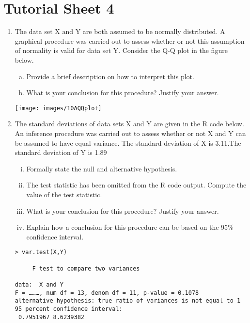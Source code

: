 \documentclass[a4paper,12pt]{article}
\begin{document}
\section*{Tutorial Sheet 4}
\begin{enumerate}

    
    \item


The data set X and Y are both assumed to be normally distributed. A graphical procedure was carried out to assess whether or not this assumption of normality is valid for data set Y. Consider the Q-Q plot in the figure below.
\begin{enumerate}[(a)]
\item Provide a brief description on how to interpret this plot.
\item What is your conclusion for this procedure? Justify your answer.
\end{enumerate}

	
	\begin{center}
		\texttt{[image: images/10AQQplot]}
	\end{center}
	

    \item

The standard deviations of data sets X and Y are given in the R code below. An inference procedure was carried out to assess whether or not X and Y can be assumed to have equal variance.
The standard deviation of X is 3.11.The standard deviation of Y is 1.89

\begin{enumerate}[(i)]
\item Formally state the null and alternative hypothesis.
\item The test statistic has been omitted from the R code output. Compute the value of the test statistic.
\item What is your conclusion for this procedure? Justify your answer.
\item Explain how a conclusion for this procedure can be based on the 95\% confidence interval.
\end{enumerate}
\begin{framed}
\begin{verbatim}
> var.test(X,Y)

     F test to compare two variances

data:  X and Y 
F = ………, num df = 13, denom df = 11, p-value = 0.1078
alternative hypothesis: true ratio of variances is not equal to 1 
95 percent confidence interval:
 0.7951967 8.6239382 


\end{verbatim}
\end{framed}
\end{enumerate}
\end{document}
